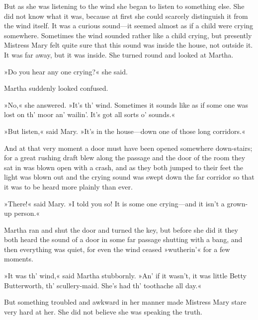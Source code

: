 But as she was listening to the wind she began to listen to something else. She did not know what it was, because at first she could scarcely distinguish it from the wind itself. It was a curious sound—it seemed almost as if a child were crying somewhere. Sometimes the wind sounded rather like a child crying, but presently Mistress Mary felt quite sure that this sound was inside the house, not outside it. It was far away, but it was inside. She turned round and looked at Martha.

»Do you hear any one crying?« she said.

Martha suddenly looked confused.

»No,« she answered. »It's th' wind. Sometimes it sounds like as if some one was lost on th' moor an' wailin'. It's got all sorts o' sounds.«

»But listen,« said Mary. »It's in the house—down one of those long corridors.«

And at that very moment a door must have been opened somewhere down-stairs; for a great rushing draft blew along the passage and the door of the room they sat in was blown open with a crash, and as they both jumped to their feet the light was blown out and the crying sound was swept down the far corridor so that it was to be heard more plainly than ever.

»There!« said Mary. »I told you so! It is some one crying—and it isn't a grown-up person.«

Martha ran and shut the door and turned the key, but before she did it they both heard the sound of a door in some far passage shutting with a bang, and then everything was quiet, for even the wind ceased »wutherin'« for a few moments.

»It was th' wind,« said Martha stubbornly. »An' if it wasn't, it was little Betty Butterworth, th' scullery-maid. She's had th' toothache all day.«

But something troubled and awkward in her manner made Mistress Mary stare very hard at her. She did not believe she was speaking the truth.